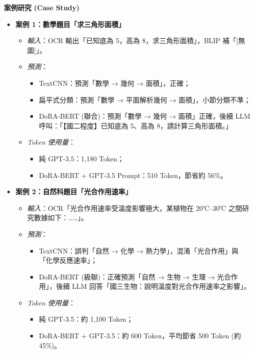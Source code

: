 \documentclass[10pt]{article}
\begin{document}
\begin{CJK}{UTF8}{bsmi}
\vspace{1ex}
\noindent\textbf{案例研究 (Case Study)}
\begin{itemize}
  \item \textbf{案例 1：數學題目「求三角形面積」}  
    \begin{itemize}
      \item \textit{輸入}：OCR 輸出「已知底為 5，高為 8，求三角形面積」，BLIP 補「[無圖]」。  
      \item \textit{預測}：  
        \begin{itemize}
          \item TextCNN：預測「數學 → 幾何 → 面積」，正確；  
          \item 扁平式分類：預測「數學 → 平面解析幾何 → 面積」，小節分類不準；  
          \item DoRA‐BERT (聯合)：預測「數學 → 幾何 → 面積」正確，後續 LLM 呼叫：「【國二程度】已知底為 5、高為 8，請計算三角形面積。」  
        \end{itemize}
      \item \textit{Token 使用量}：  
        \begin{itemize}
          \item 純 GPT-3.5：1,180 Token；  
          \item DoRA‐BERT + GPT-3.5 Prompt：510 Token，節省約 56\%。  
        \end{itemize}
    \end{itemize}

  \item \textbf{案例 2：自然科題目「光合作用速率」}  
    \begin{itemize}
      \item \textit{輸入}：OCR「光合作用速率受溫度影響極大，某植物在 20℃–30℃ 之間研究數據如下：……」。  
      \item \textit{預測}：  
        \begin{itemize}
          \item TextCNN：誤判「自然 → 化學 → 熱力學」，混淆「光合作用」與「化學反應速率」；  
          \item DoRA‐BERT (級聯)：正確預測「自然 → 生物 → 生理 → 光合作用」，後續 LLM 回答「國三生物：說明溫度對光合作用速率之影響」。  
        \end{itemize}
      \item \textit{Token 使用量}：  
        \begin{itemize}
          \item 純 GPT-3.5：約 1,100 Token；  
          \item DoRA‐BERT + GPT-3.5：約 600 Token，平均節省 500 Token (約 45\%)。  
        \end{itemize}
    \end{itemize}
\end{itemize}


\end{CJK}
\end{document}
